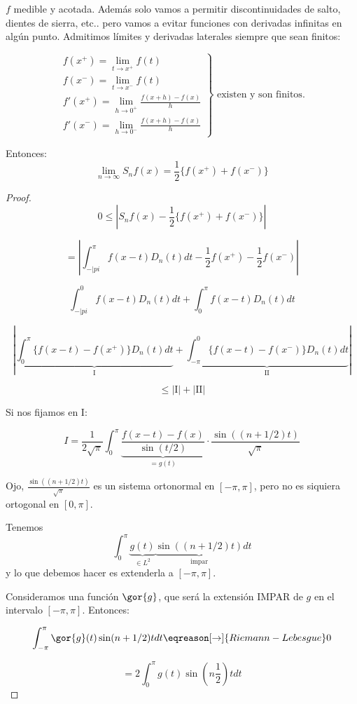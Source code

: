 	\begin{theorem}[Dirichlet 2]

		$f$ medible y acotada. Además solo vamos a permitir discontinuidades de salto, dientes de sierra, etc.. pero vamos a evitar funciones con derivadas infinitas en algún punto. Admitimos límites y derivadas laterales siempre que sean finitos:


		\[
		\left.
		\begin{array}{l}
			f(x^+) = \lim_{t \to x^+} f(t) \\
			f(x^-) = \lim_{t \to x^-} f(t) \\
			f'(x^+) = \lim_{h \to 0^+} \frac{f(x+h)-f(x)}{h} \\
			f'(x^-) = \lim_{h \to 0^-} \frac{f(x+h)-f(x)}{h}
		\end{array} \right\} \text{ existen y son finitos.}
		\]

		Entonces: \[ \lim_{n \to \infty} S_nf(x) = \frac{1}{2} \{f(x^+)+f(x^-)\}\]

	\end{theorem}

	\begin{proof}

		\[ 0 \leq | S_n f(x) - \frac{1}{2} \{f(x^+) + f(x^-)\} |\]

		\[ = \left| \int_{-|pi}^\pi f(x-t) D_n (t) dt - \frac{1}{2} f(x^+)- \frac{1}{2} f(x^-) \right|  \]

		\[ \int_{-|pi}^{0} f(x-t) D_n(t)dt + \int_{0}^\pi f(x-t) D_n(t) dt \]

		\[ \left| \underbrace{\int_0^\pi  \{ f(x-t) - f(x^+) \} D_n(t) dt }_{\text{I}} + \underbrace{\int_{-\pi}^{0}  \{ f(x-t) - f(x^-) \} D_n(t) dt }_{\text{II}} \right| \]

		\[\leq | \text{I} | +  |\text{II}| \]

		Si nos fijamos en I:

		\[ I = \frac{1}{2\sqrt{\pi}} \int_{0}^\pi \underbrace{\frac{f(x-t)-f(x)}{\sin(t/2)}}_{=g(t)} \cdot \frac{\sin((n+1/2)t)}{\sqrt{\pi}} \]

		Ojo, $\frac{\sin((n+1/2)t)}{\sqrt{\pi}}$ es un sistema ortonormal en $[-\pi,\pi]$, pero no es siquiera ortogonal en $[0,\pi]$.

		Tenemos
		\[ \int_{0}^\pi \underbrace{g(t)}_{\in L^2} \underbrace{\sin((n+1/2)t)}_{\text{impar}} dt \]
		y lo que debemos hacer es extenderla a $[-\pi,\pi]$.

		Consideramos una función $\gor{g}$, que será la extensión IMPAR de $g$ en el intervalo $[-\pi,\pi]$. Entonces:

		\[ \int_{-\pi}^\pi  \gor{g}(t) \sin(n+1/2)t dt \eqreason[\rightarrow]{Riemann-Lebesgue} 0 \]

		\[ = 2 \int_{0}^\pi g(t) \sin(n \frac{1}{2}) t dt \]


	\end{proof}


